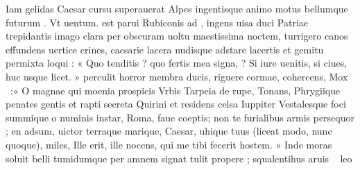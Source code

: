 \documentclass[12pt, a4paper]{report} ﻿
\begin{document}
            Iam gelidas Caesar cursu superauerat Alpes
            ingentisque animo motus bellumque futurum
            . Vt uentum. est parui Rubiconis ad ,
            ingens uisa duci Patriae trepidantis imago
            clara per obscuram uoltu maestissima noctem,
            turrigero canos effundens uertice crines,
            caesarie lacera nudisque adstare lacertis
            et gemitu permixta loqui : « Quo tenditis  ?
            quo fertis mea signa, ? Si iure uenitis,
            si ciues, huc usque licet. »  perculit horror
            membra ducis, riguere cormae,  cohercens,
            Mox  :« O magnae qui moenia prospicis Vrbis
            Tarpeia de rupe, Tonans, Phrygiique penates
            gentis  et rapti secreta Quirini
            et residens celsa  Iuppiter 
            Vestalesque foci summique o numinis instar,
            Roma, faue coeptis; non te furialibus armis
            persequor ; en adsum, uictor terraque marique,
            Caesar, uhique tuus (liceat modo, nunc quoque), miles,
            Ille erit, ille nocens, qui me tibi fecerit hostem. »
             Inde moras soluit belli tumidumque per amnem
            signat tulit propere ;  squalentihus aruis
              leo 
            
\end{document}
